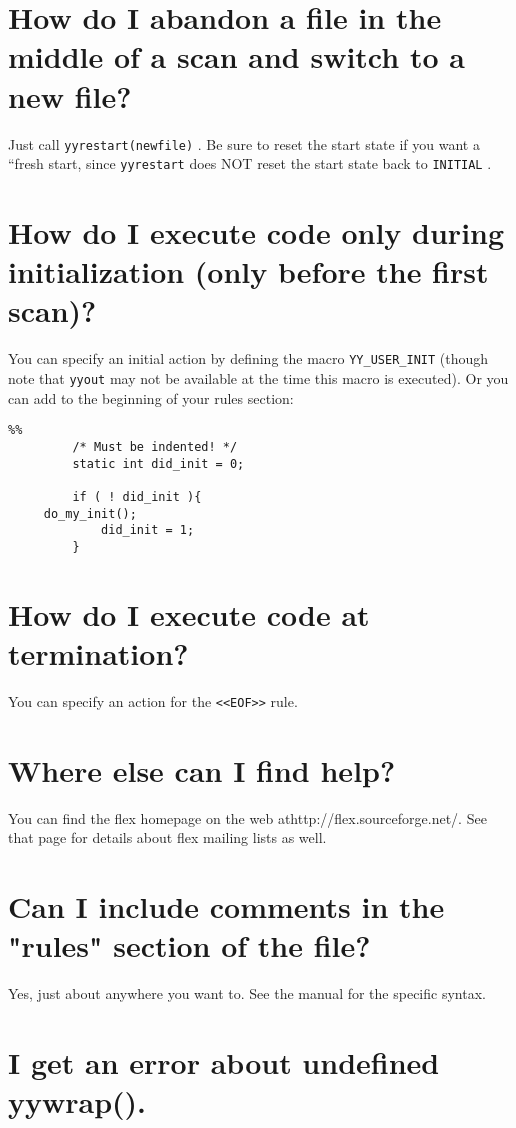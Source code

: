 \documentclass[openany,oneside]{book}
\begin{document}
\section{How do I abandon a file in the middle of a scan and switch to a new file?}


Just call \verb`yyrestart(newfile)` . Be sure to reset the start state if you want a
“fresh start, since \verb`yyrestart` does NOT reset the start state back to \verb`INITIAL` .
\section{How do I execute code only during initialization (only before the first scan)?}


You can specify an initial action by defining the macro \verb`YY_USER_INIT` (though
note that \verb`yyout` may not be available at the time this macro is executed).  Or you
can add to the beginning of your rules section:
\begin{verbatim}
%%
         /* Must be indented! */
         static int did_init = 0;
     
         if ( ! did_init ){
     do_my_init();
             did_init = 1;
         }
\end{verbatim}

\section{How do I execute code at termination?}


You can specify an action for the \verb`<<EOF>>` rule.
\section{Where else can I find help?}


You can find the flex homepage on the web athttp://flex.sourceforge.net/. See that page for details about flex
mailing lists as well.
\section{Can I include comments in the "rules" section of the file?}


Yes, just about anywhere you want to. See the manual for the specific syntax.
\section{I get an error about undefined yywrap().}
\end{document}
